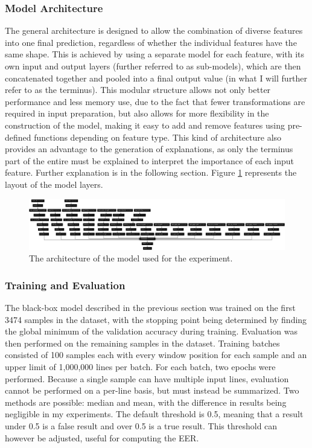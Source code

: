 \documentclass{article}
\begin{document}
			\subsubsection{Model Architecture}
			The general architecture is designed to allow the combination of diverse features into
			one final prediction, regardless of whether the individual features have the same
			shape. This is achieved by using a separate model for each feature, with its own input
			and output layers (further referred to as sub-models), which are then concatenated
			together and pooled into a final output value (in what I will further refer to as the
			terminus). This modular structure allows not only better performance and less memory
			use, due to the fact that fewer transformations are required in input preparation, but
			also allows for more flexibility in the construction of the model, making it easy to
			add and remove features using pre-defined functions depending on feature type. This
			kind of architecture also provides an advantage to the generation of explanations, as
			only the terminus part of the entire must be explained to interpret the importance of
			each input feature. Further explanation is in the following section. Figure
			\ref{fig:model_plot} represents the layout of the model layers.
			\begin{figure}[htbp]
				\begin{center}
					\includegraphics[width=1\textwidth]{images/model_plot.png}
					\caption{The architecture of the model used for the experiment.}
					\label{fig:model_plot}
				\end{center}
			\end{figure}
			\subsubsection{Training and Evaluation}
			The black-box model described in the previous section was trained on the first 3474
			samples in the dataset, with the stopping point being determined by finding the global
			minimum of the validation accuracy during training. Evaluation was then performed on
			the remaining samples in the dataset. Training batches consisted of 100 samples each
			with every window position for each sample and an upper limit of 1,000,000 lines per
			batch. For each batch, two epochs were performed. Because a single sample can have
			multiple input lines, evaluation cannot be performed on a per-line basis, but must
			instead be summarized. Two methods are possible: median and mean, with the difference
			in results being negligible in my experiments. The default threshold is 0.5, meaning
			that a result under 0.5 is a false result and over 0.5 is a true result. This
			threshold can however be adjusted, useful for computing the EER.
\end{document}
